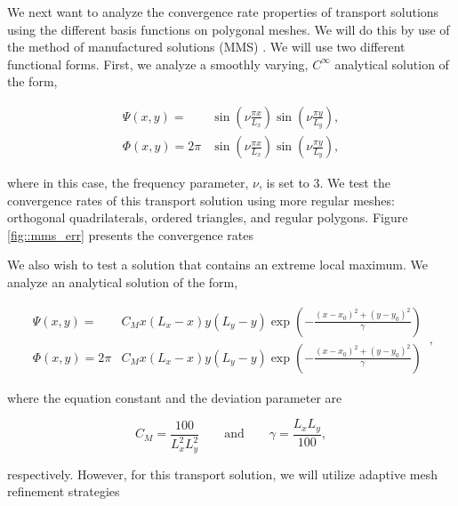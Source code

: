 \documentclass[11pt]{article}
\begin{document}
We next want to analyze the convergence rate properties of transport solutions using the different basis functions on polygonal meshes. We will do this by use of the method of manufactured solutions (MMS) \cite{salari2000code}. We will use two different functional forms. First, we analyze a smoothly varying, $C^{\infty}$ analytical solution of the form,

\begin{equation}
\label{eq::sin_eq}
\begin{aligned}
	\Psi(x,y) = &\sin (\nu \frac{\pi x}{L_x}) \sin (\nu \frac{\pi y}{L_y}), \\
	\Phi(x,y) = 2 \pi &\sin (\nu \frac{\pi x}{L_x}) \sin (\nu \frac{\pi y}{L_y}),
\end{aligned}
\end{equation}

\noindent where in this case, the frequency parameter, $\nu$, is set to 3. We test the convergence rates of this transport solution using more regular meshes: orthogonal quadrilaterals, ordered triangles, and regular polygons. Figure \ref{fig::mms_err} presents the convergence rates 

We also wish to test a solution that contains an extreme local maximum. We analyze an analytical solution of the form,

\begin{equation}
\label{eq::gauss_eq}
\begin{aligned}
	\Psi (x,y) = & C_M x (L_x - x) y (L_y - y) \exp(-\frac{(x-x_0)^2 + (y-y_0)^2}{\gamma}) \\ 
	\Phi (x,y) = 2 \pi & C_M x (L_x - x) y (L_y - y) \exp(-\frac{(x-x_0)^2 + (y-y_0)^2}{\gamma})
\end{aligned} \, ,
\end{equation}

\noindent where the equation constant and the deviation parameter are

\begin{equation}
\label{eq::gaussconsts}
C_M = \frac{100}{L_x^2 L_y^2} \qquad \text{and} \qquad \gamma = \frac{L_x L_y}{100} ,
\end{equation}

\noindent respectively. However, for this transport solution, we will utilize adaptive mesh refinement strategies 
\end{document}
